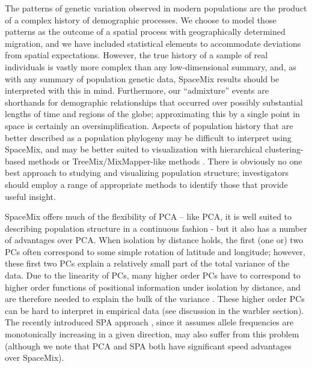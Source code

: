 \documentclass[12pt]{article}
\begin{document}
The patterns of genetic variation observed in modern populations are the product of a complex history of demographic processes.  We choose to model those patterns as the outcome of a spatial process with geographically determined migration,
and we have included statistical elements to accommodate deviations from spatial expectations.
However, the true history of a sample of real individuals is vastly more complex than any low-dimensional summary,
and, as with any summary of population genetic data, 
SpaceMix results should be interpreted with this in mind.
Furthermore, our ``admixture'' events are shorthands for demographic relationships
that occurred over possibly substantial lengths of time and regions of the globe;
approximating this by a single point in space is certainly an oversimplification.
Aspects of population history that are better described as a population phylogeny may be difficult to interpret using SpaceMix,
and may be better suited to visualization with hierarchical clustering-based methods \citep{STRUCTURE} or TreeMix/MixMapper-like methods \citep{Treemix,lipson_mixmapper_2013}.  
There is obviously no one best approach to studying and visualizing population structure;
investigators should employ a range of appropriate methods to identify those that provide useful insight. 

SpaceMix offers much of the flexibility of PCA -- like PCA, it is well suited to describing population structure in a continuous fashion - 
but it also has a number of advantages over PCA. 
When isolation by distance holds, the first (one or) two PCs often correspond to some simple rotation of latitude and longitude; 
however, these first two PCs explain a relatively small part of the total variance of the data. 
Due to the linearity of PCs, many higher order PCs 
have to correspond to higher order functions of positional information under isolation by distance, 
and are therefore needed to explain the bulk of the variance \citep{novembre_interpreting_2008}. 
These higher order PCs can be hard to interpret in empirical data (see discussion in the warbler section).
The recently introduced SPA approach \citep{yang_model-based_2012},
since it assumes allele frequencies are monotonically increasing in a given direction,
may also suffer from this problem
(although we note that PCA and SPA both have significant speed advantages over SpaceMix).  
\end{document}
